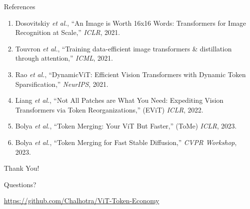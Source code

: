 \documentclass[aspectratio=169, 11pt]{beamer}
\begin{document}
\begin{frame}{References}
\small
\begin{enumerate}
  \item Dosovitskiy \textit{et al.}, ``An Image is Worth 16x16 Words: Transformers for Image Recognition at Scale,'' \textit{ICLR}, 2021.
  \item Touvron \textit{et al.}, ``Training data-efficient image transformers \& distillation through attention,'' \textit{ICML}, 2021.
  \item Rao \textit{et al.}, ``DynamicViT: Efficient Vision Transformers with Dynamic Token Sparsification,'' \textit{NeurIPS}, 2021.
  \item Liang \textit{et al.}, ``Not All Patches are What You Need: Expediting Vision Transformers via Token Reorganizations,'' (EViT) \textit{ICLR}, 2022.
  \item Bolya \textit{et al.}, ``Token Merging: Your ViT But Faster,'' (ToMe) \textit{ICLR}, 2023.
  \item Bolya \textit{et al.}, ``Token Merging for Fast Stable Diffusion,'' \textit{CVPR Workshop}, 2023.
\end{enumerate}
\end{frame}

\begin{frame}
\begin{center}
  {\Huge Thank You!}

  \vspace{1cm}
  {\large Questions?}

  \vspace{0.5cm}
  \url{https://github.com/Chalhotra/ViT-Token-Economy}
\end{center}
\end{frame}
\end{document}
